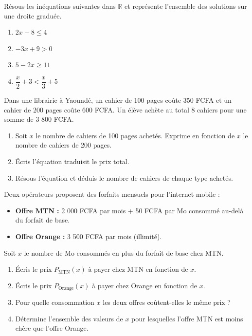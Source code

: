 \documentclass[11pt]{article}
\begin{document}
\begin{exercice}
Résous les inéquations suivantes dans $\mathbb{R}$ et représente l'ensemble des solutions sur une droite graduée.
\begin{enumerate}
    \item $2x - 8 \leqslant 4$
    \item $-3x + 9 > 0$
    \item $5 - 2x \geqslant 11$
    \item $\dfrac{x}{2} + 3 < \dfrac{x}{3} + 5$
\end{enumerate}
\end{exercice}

\begin{exercice}
Dans une librairie à Yaoundé, un cahier de 100 pages coûte 350 FCFA et un cahier de 200 pages coûte 600 FCFA. Un élève achète au total 8 cahiers pour une somme de 3 800 FCFA.
\begin{enumerate}
    \item Soit $x$ le nombre de cahiers de 100 pages achetés. Exprime en fonction de $x$ le nombre de cahiers de 200 pages.
    \item Écris l'équation traduisit le prix total.
    \item Résous l'équation et déduis le nombre de cahiers de chaque type achetés.
\end{enumerate}
\end{exercice}

\begin{exercice}
Deux opérateurs proposent des forfaits mensuels pour l'internet mobile :
\begin{itemize}
    \item \textbf{Offre MTN :} 2 000 FCFA par mois + 50 FCFA par Mo consommé au-delà du forfait de base.
    \item \textbf{Offre Orange :} 3 500 FCFA par mois (illimité).
\end{itemize}
Soit $x$ le nombre de Mo consommés en plus du forfait de base chez MTN.
\begin{enumerate}
    \item Écris le prix $P_{\text{MTN}}(x)$ à payer chez MTN en fonction de $x$.
    \item Écris le prix $P_{\text{Orange}}(x)$ à payer chez Orange en fonction de $x$.
    \item Pour quelle consommation $x$ les deux offres coûtent-elles le même prix ?
    \item Détermine l'ensemble des valeurs de $x$ pour lesquelles l'offre MTN est moins chère que l'offre Orange.
\end{enumerate}
\end{exercice}
\end{document}
